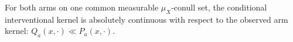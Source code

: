 For both arms on one common measurable \(\mu_X\)-conull set, the conditional interventional kernel is absolutely continuous with respect to the observed arm kernel: \(Q_a(x,\cdot)\ll P_a(x,\cdot)\).